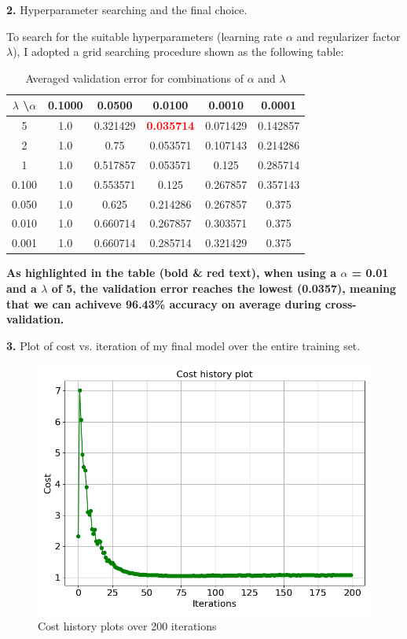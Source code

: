 \textbf{2.} Hyperparameter searching and the final choice.

To search for the suitable hyperparameters (learning rate $\alpha$ and regularizer factor $\lambda$), I adopted a grid searching procedure shown as the following table:


\begin{table}[H]
    \centering
    \begin{tabular}{c|ccccc}
    $\lambda$ \textbackslash $\alpha$ & 
    0.1000  &  0.0500  &  0.0100  &  0.0010  &  0.0001 \\
    \hline
        5 &    1.0 & 0.321429 & \textcolor{red}{\textbf{0.035714}} & 0.071429 & 0.142857 \\
        2 &   1.0   &   0.75 & 0.053571 & 0.107143 & 0.214286 \\
        1 &   1.0 & 0.517857 & 0.053571   &  0.125 & 0.285714 \\
        0.100  &  1.0 & 0.553571  &   0.125 & 0.267857 & 0.357143 \\
        0.050  &  1.0  &   0.625 & 0.214286 & 0.267857   &  0.375 \\
        0.010  &  1.0 & 0.660714 & 0.267857 & 0.303571   &  0.375 \\ 
        0.001  &  1.0 & 0.660714 & 0.285714 & 0.321429  &   0.375 \\
        \hline
    \end{tabular}
    \caption{Averaged validation error for combinations of $\alpha$ and $\lambda$}
    \label{tab:Averaged validation error}
\end{table}

\textbf{As highlighted in the table (bold \& red text), when using a $\alpha$ = 0.01 and a $\lambda$ of 5, the validation error reaches the lowest (0.0357), meaning that we can achiveve 96.43\% accuracy on average during cross-validation.}



\textbf{3.} Plot of cost vs. iteration of my final model over the entire training set.


\begin{figure}[H]
    \centering
    \includegraphics[width=120mm]{Cost_history_on_training_set.png}
    \caption{Cost history plots over 200 iterations}
    \label{fig:cost history}
\end{figure}


